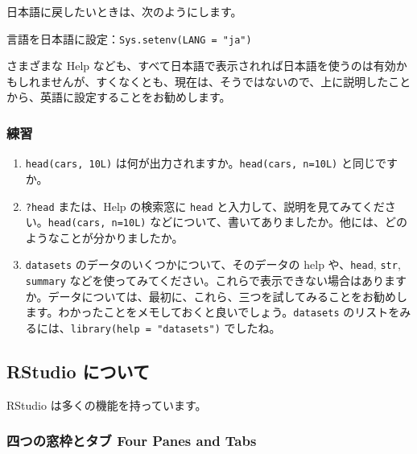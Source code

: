 \documentclass[
]{bxjsbook}
\providecommand{\tightlist}{%
  \setlength{\itemsep}{0pt}\setlength{\parskip}{0pt}}
\theoremstyle{definition}
\theoremstyle{definition}
\theoremstyle{definition}
\theoremstyle{definition}
\theoremstyle{remark}
\begin{document}
日本語に戻したいときは、次のようにします。

言語を日本語に設定：\texttt{Sys.setenv(LANG\ =\ "ja")}

さまざまな Help なども、すべて日本語で表示されれば日本語を使うのは有効かもしれませんが、すくなくとも、現在は、そうではないので、上に説明したことから、英語に設定することをお勧めします。

\hypertarget{ux7df4ux7fd2}{%
\subsubsection{練習}\label{ux7df4ux7fd2}}

\begin{enumerate}
\def\labelenumi{\arabic{enumi}.}
\tightlist
\item
  \texttt{head(cars,\ 10L)} は何が出力されますか。\texttt{head(cars,\ n=10L)} と同じですか。
\item
  \texttt{?head} または、Help の検索窓に \texttt{head} と入力して、説明を見てみてください。\texttt{head(cars,\ n=10L)} などについて、書いてありましたか。他には、どのようなことが分かりましたか。
\item
  \texttt{datasets} のデータのいくつかについて、そのデータの help や、\texttt{head}, \texttt{str}, \texttt{summary} などを使ってみてください。これらで表示できない場合はありますか。データについては、最初に、これら、三つを試してみることをお勧めします。わかったことをメモしておくと良いでしょう。\texttt{datasets} のリストをみるには、\texttt{library(help\ =\ "datasets")} でしたね。
\end{enumerate}

\hypertarget{rstudio-ux306bux3064ux3044ux3066}{%
\subsection{RStudio について}\label{rstudio-ux306bux3064ux3044ux3066}}

RStudio は多くの機能を持っています。

\hypertarget{ux56dbux3064ux306eux7a93ux67a0ux3068ux30bfux30d6-four-panes-and-tabs}{%
\subsubsection{四つの窓枠とタブ Four Panes and Tabs}\label{ux56dbux3064ux306eux7a93ux67a0ux3068ux30bfux30d6-four-panes-and-tabs}}
\end{document}
